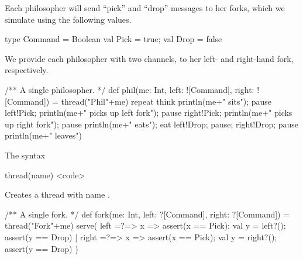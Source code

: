 \documentclass[notes,color]{sepslide0}
\begin{document}

\begin{slide}

Each philosopher will send ``pick'' and ``drop'' messages to her forks, which
we simulate using the following values.
%
\begin{scala}
  type Command = Boolean
  val Pick = true; val Drop = false
\end{scala}
\end{slide}


\begin{slide}

We provide each philosopher with two channels, to her left- and right-hand
fork, respectively.  
\begin{scala}
  /** A single philosopher. */
  def phil(me: Int, left: ![Command], right: ![Command]) = thread("Phil"+me){
    repeat{
      think
      println(me+" sits"); pause
      left!Pick; println(me+" picks up left fork"); pause
      right!Pick; println(me+" picks up right fork"); pause
      println(me+" eats"); eat
      left!Drop; pause; right!Drop; pause
      println(me+" leaves")
    }
  }
\end{scala}
\end{slide}


\begin{selfnote}
The syntax 
\begin{scala}
thread(name){ <code> }
\end{scala}
Creates a thread with name .
\end{selfnote}


\begin{slide}

\begin{scala}
  /** A single fork. */
  def fork(me: Int, left: ?[Command], right: ?[Command]) = thread("Fork"+me){
    serve(
      left =?=> { 
        x => assert(x == Pick); val y = left?(); assert(y == Drop) 
      }
      | 
      right =?=> { 
        x => assert(x == Pick); val y = right?(); assert(y == Drop) 
      }
    )
  }
\end{scala}
\end{slide}

\end{document}
